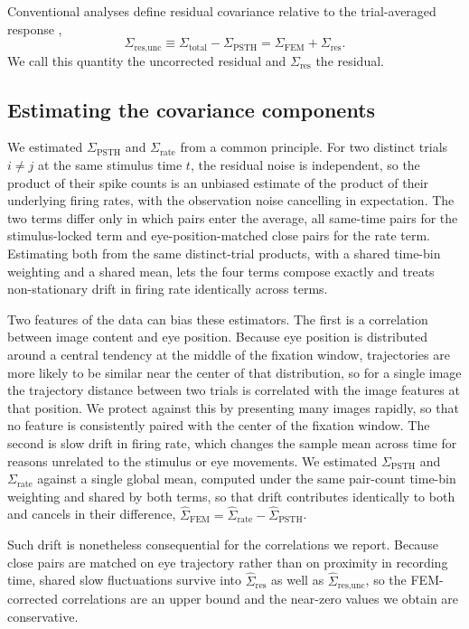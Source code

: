 \documentclass{lite}
\newcommand{\Cpsth}{\Sigma_{\text{PSTH}}}
\newcommand{\Crate}{\Sigma_{\text{rate}}}
\begin{document}
Conventional analyses define residual covariance relative to the trial-averaged response \cite{bair2001correlated,kohn2005stimulus},
\begin{equation}
\Sigma_{\text{res}, \text{unc}} \equiv \Sigma_{\text{total}} - \Sigma_{\text{PSTH}} = \Sigma_{\text{FEM}} + \Sigma_{\text{res}}.
\end{equation}
We call this quantity the uncorrected residual and $\Sigma_{\text{res}}$ the residual.

\subsection{Estimating the covariance components}

We estimated $\Cpsth$ and $\Crate$ from a common principle. For two distinct trials $i \neq j$ at the same stimulus time $t$, the residual noise is independent, so the product of their spike counts is an unbiased estimate of the product of their underlying firing rates, with the observation noise cancelling in expectation. The two terms differ only in which pairs enter the average, all same-time pairs for the stimulus-locked term and eye-position-matched close pairs for the rate term. Estimating both from the same distinct-trial products, with a shared time-bin weighting and a shared mean, lets the four terms compose exactly and treats non-stationary drift in firing rate identically across terms.

Two features of the data can bias these estimators. The first is a correlation between image content and eye position. Because eye position is distributed around a central tendency at the middle of the fixation window, trajectories are more likely to be similar near the center of that distribution, so for a single image the trajectory distance between two trials is correlated with the image features at that position. We protect against this by presenting many images rapidly, so that no feature is consistently paired with the center of the fixation window. The second is slow drift in firing rate, which changes the sample mean across time for reasons unrelated to the stimulus or eye movements. We estimated $\Cpsth$ and $\Crate$ against a single global mean, computed under the same pair-count time-bin weighting and shared by both terms, so that drift contributes identically to both and cancels in their difference, $\hat{\Sigma}_{\mathrm{FEM}} = \hat{\Sigma}_{\mathrm{rate}} - \hat{\Sigma}_{\mathrm{PSTH}}$.

Such drift is nonetheless consequential for the correlations we report. Because close pairs are matched on eye trajectory rather than on proximity in recording time, shared slow fluctuations survive into $\hat{\Sigma}_{\mathrm{res}}$ as well as $\hat{\Sigma}_{\text{res}, \text{unc}}$, so the FEM-corrected correlations are an upper bound and the near-zero values we obtain are conservative.
\end{document}
